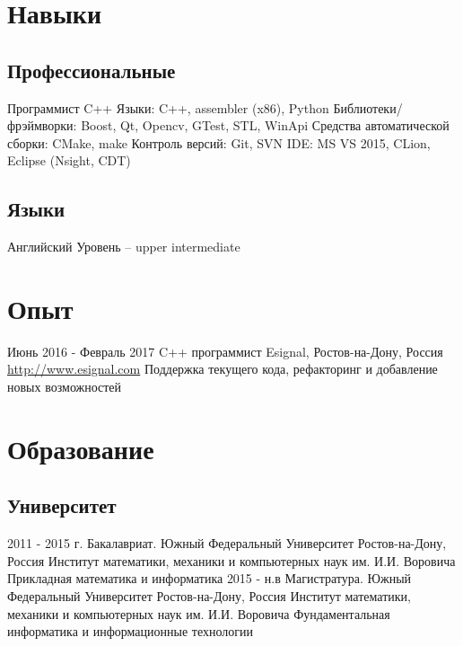 \documentclass[11pt,a4paper]{moderncv}
\begin{document}
\maketitle

\section{Навыки}
  \subsection{Профессиональные}
    \cvline
    {Программист C++}
      {
      Языки: C++, assembler (x86), Python\newline{}
      Библиотеки/фрэймворки: Boost, Qt, Opencv, GTest, STL, WinApi \newline{}
      Средства автоматической сборки: CMake, make \newline{}
      Контроль версий: Git, SVN \newline{}
      IDE: MS VS 2015, CLion, Eclipse (Nsight, CDT)
      }
  \subsection{Языки}
    \cvline
    {Английский}
      {
      Уровень -- upper intermediate \newline{}
      }

\section{Опыт}
\cventry
  {Июнь 2016 - Февраль 2017}
  {C++ программист}
  {Esignal, Ростов-на-Дону, Россия}
  {\newline{}\url{http://www.esignal.com}}{}
  {Поддержка текущего кода, рефакторинг и добавление новых возможностей}

\section{Образование}
  \subsection{Университет}
    \cventry
      {2011 - 2015 г.}
      {Бакалавриат. Южный Федеральный Университет}
      {Ростов-на-Дону, Россия}
      {Институт математики, механики и компьютерных наук им. И.И. Воровича}
      {Прикладная математика и информатика}
      {}
    \cventry
      {2015 - н.в}
      {Магистратура. Южный Федеральный Университет}
      {Ростов-на-Дону, Россия}
      {Институт математики, механики и компьютерных наук им. И.И. Воровича}
      {Фундаментальная информатика и информационные технологии}
      {}
\end{document}
